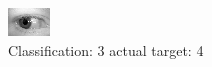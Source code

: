 \begin{figure}[h!]
\begin{center}
\includegraphics[width=0.60\columnwidth]{figures/ID751_class_3_target_4.png}
\end{center}
\caption{ Classification: 3 actual target: 4}
\label{fig:ID751_class_3_target_4}
\end{figure}
